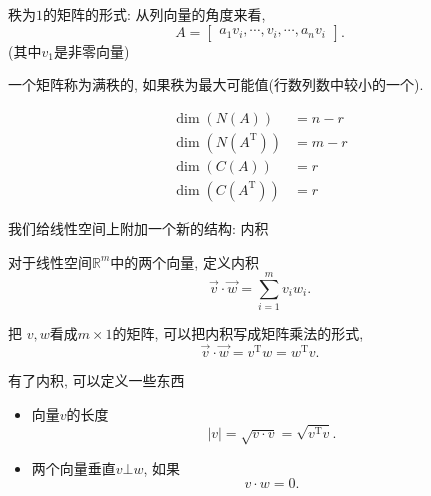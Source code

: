 
\begin{example}
    秩为$1$的矩阵的形式: 
    从列向量的角度来看, 
    \begin{equation}
      A = \begin{bmatrix} a_1v_i, \cdots, v_i, \cdots, a_nv_i \end{bmatrix}.
    \end{equation}
    (其中$v_1$是非零向量)
\end{example}

\begin{definition}
    一个矩阵称为满秩的, 如果秩为最大可能值(行数列数中较小的一个).
\end{definition}

\begin{equation}
  \begin{aligned}
    \operatorname{dim}\left( N(A) \right) & = n-r 
    \\
    \operatorname{dim}\left( N(A^{\mathrm{T}}) \right) & = m-r
    \\
    \operatorname{dim}\left( C(A) \right) & = r
    \\
    \operatorname{dim}\left( C(A^{\mathrm{T}}) \right) & = r
  \end{aligned}
\end{equation}

我们给线性空间上附加一个新的结构: 内积
\begin{definition}
    对于线性空间$\mathbb{R}^{m}$中的两个向量, 定义内积
    \begin{equation}
      \vec{v}\cdot \vec{w} = \sum_{i=1}^{m} v_i w_i.
    \end{equation}
\end{definition}

把 $v,w$看成$m \times 1$的矩阵, 可以把内积写成矩阵乘法的形式,
\begin{equation}
  \vec{v}\cdot \vec{w} = v^{\mathrm{T}}w=w^{\mathrm{T}}v.
\end{equation}

有了内积, 可以定义一些东西
\begin{itemize}
    \item 向量$v$的长度
    \begin{equation}
        |v| = \sqrt{v\cdot v}=\sqrt{v^{\mathrm{T}}v}.
    \end{equation}
    \item 两个向量垂直$v\bot w$, 如果
    \begin{equation}
        v \cdot w = 0.
    \end{equation}
\end{itemize}

